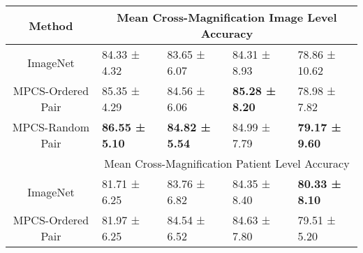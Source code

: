 \documentclass[conference]{IEEEtran}
\begin{document}
\begin{table}[h]
{\begin{tabular}{c|llll}
\multirow{-2}{*}{Method} & \multicolumn{4}{c}{Mean Cross-Magnification Image Level Accuracy}                                                                                                                                                                                                                                                                           \\ \hline
ImageNet        & \multicolumn{1}{l|}{{\color[HTML]{444444} 84.33 ±   4.32}}                       & \multicolumn{1}{l|}{{\color[HTML]{444444} 83.65 ±   6.07}}                        & \multicolumn{1}{l|}{{\color[HTML]{444444} 84.31 ±   8.93}}                        & {\color[HTML]{444444} 78.86 ±   10.62}                                           \\
MPCS-Ordered Pair             & \multicolumn{1}{l|}{{\color[HTML]{444444} 85.35 ±   4.29}}                       & \multicolumn{1}{l|}{{\color[HTML]{444444} 84.56 ±   6.06}}                        & \multicolumn{1}{l|}{{\color[HTML]{444444} \textbf{85.28 ±   8.20}}}               & {\color[HTML]{444444} 78.98 ±   7.82}                                            \\
MPCS-Random Pair              & \multicolumn{1}{l|}{{\color[HTML]{444444} \textbf{86.55 ±   5.10}}}              & \multicolumn{1}{l|}{{\color[HTML]{444444} \textbf{84.82 ±   5.54}}}               & \multicolumn{1}{l|}{{\color[HTML]{444444} 84.99 ±   7.79}}                        & {\color[HTML]{444444} \textbf{79.17 ±   9.60}}                                   \\ \hline
\multicolumn{1}{l|}{}    & \multicolumn{4}{c}{Mean Cross-Magnification Patient Level Accuracy}                                                                                                                                                                                                                                                                         \\ \hline
ImageNet        & \multicolumn{1}{l|}{{\color[HTML]{444444} 81.71 ±   6.25}}                       & \multicolumn{1}{l|}{{\color[HTML]{444444} 83.76 ±   6.82}}                        & \multicolumn{1}{l|}{{\color[HTML]{444444} 84.35 ±   8.40}}                        & {\color[HTML]{444444} \textbf{80.33 ±   8.10}}                                   \\
MPCS-Ordered Pair             & \multicolumn{1}{l|}{{\color[HTML]{444444} 81.97 ±   6.25}}                       & \multicolumn{1}{l|}{{\color[HTML]{444444} 84.54 ±   6.52}}                        & \multicolumn{1}{l|}{{\color[HTML]{444444} 84.63 ±   7.80}}                        & {\color[HTML]{444444} 79.51 ±   5.20}                                            \\

\end{tabular}}
\end{table}
\end{document}
